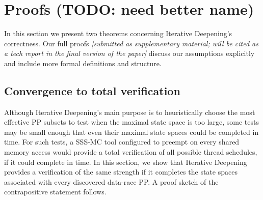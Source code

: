 \section{Proofs (TODO: need better name)}
\label{sec:soundness}

In this section we present two theorems concerning Iterative Deepening's correctness.
Our full proofs
{\em [submitted as supplementary material; will be cited as a tech report in the final version of the paper]}
discuss our assumptions explicitly and include more formal definitions and structure.

\renewcommand\proofname{Proof Sketch}


\subsection{Convergence to total verification}
\label{sec:totalverif}

Although Iterative Deepening's main purpose is to heuristically choose the most effective PP subsets to test
when the maximal state space is too large,
some tests may be small enough that even their maximal state spaces could be completed in time.
For such tests, a SSS-MC tool configured to preempt on every shared memory access \cite{spin} would provide a total verification of all possible thread schedules, if it could complete in time.
In this section, we show that Iterative Deepening provides a verification of the same strength if it completes the state spaces associated with every discovered data-race PP.
A proof sketch of the contrapositive statement follows.

